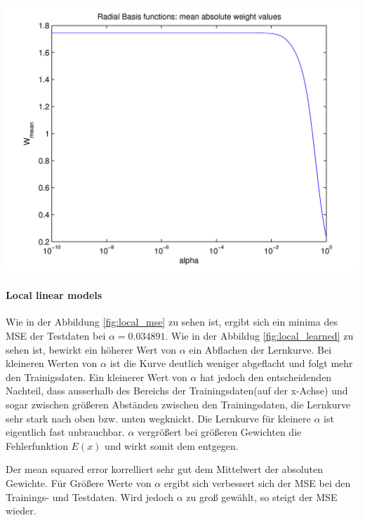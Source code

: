   \begin{center}
	\includegraphics[width=15cm]{figures/114/radial_meanweight.png}
	\label{fig:radial_meanweight}
  \end{center}



\paragraph{Local linear models}


Wie in der Abbildung \ref{fig:local_mse} zu sehen ist, ergibt sich ein minima des MSE der Testdaten
bei $\alpha = 0.034891$. Wie in der Abbildug \ref{fig:local_learned} zu sehen ist, bewirkt ein höherer Wert von
$\alpha$ ein Abflachen der Lernkurve. Bei kleineren Werten von $\alpha$ ist die Kurve deutlich weniger abgeflacht und
folgt mehr den Trainigsdaten. Ein kleinerer Wert von $\alpha$ hat jedoch den entscheidenden Nachteil, dass ausserhalb
des Bereichs der Trainingsdaten(auf der x-Achse) und sogar zwischen größeren Abständen
zwischen den Trainingsdaten, die Lernkurve sehr stark nach oben bzw. unten wegknickt. Die Lernkurve für kleinere $\alpha$
ist eigentlich fast unbrauchbar.
$\alpha$ vergrößert bei größeren Gewichten die Fehlerfunktion $E(x)$ und wirkt somit dem entgegen.

Der mean squared error korrelliert sehr gut dem Mittelwert der absoluten Gewichte. Für Größere Werte von $\alpha$
ergibt sich verbessert sich der MSE bei den Trainings- und Testdaten. Wird jedoch $\alpha$ zu groß gewählt, so steigt
der MSE wieder.


